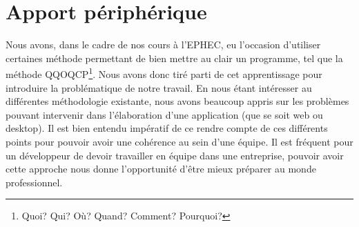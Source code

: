 \section{Apport périphérique}
Nous avons, dans le cadre de nos cours à l'EPHEC, eu l'occasion d'utiliser certaines méthode permettant de bien mettre au clair un programme, tel que la méthode QQOQCP\footnote{Quoi? Qui? Où? Quand? Comment? Pourquoi?}. Nous avons donc tiré parti de cet apprentissage pour introduire la problématique de notre travail. En nous étant intéresser au différentes méthodologie existante, nous avons beaucoup appris sur les problèmes pouvant intervenir dans l'élaboration d'une application (que se soit web ou desktop). Il est bien entendu impératif de ce rendre compte de ces différents points pour pouvoir avoir une cohérence au sein d'une équipe. Il est fréquent pour un développeur de devoir travailler en équipe dans une entreprise, pouvoir avoir cette approche nous donne l'opportunité d'être mieux préparer au monde professionnel.



    
%    
%
